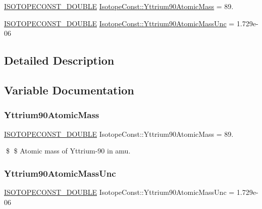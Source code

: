 \begin{DoxyCompactItemize}
\item 
\mbox{\hyperlink{group___isotope_const-_macros_ga8f45a7272ce02c0b4c65c44636ed719a}{I\+S\+O\+T\+O\+P\+E\+C\+O\+N\+S\+T\+\_\+\+D\+O\+U\+B\+LE}} \mbox{\hyperlink{group___isotope_const-_yttrium-_y90_gafc8eecd3394b7f646ce1ec90abb9c08e}{Isotope\+Const\+::\+Yttrium90\+Atomic\+Mass}} = 89.
\item 
\mbox{\hyperlink{group___isotope_const-_macros_ga8f45a7272ce02c0b4c65c44636ed719a}{I\+S\+O\+T\+O\+P\+E\+C\+O\+N\+S\+T\+\_\+\+D\+O\+U\+B\+LE}} \mbox{\hyperlink{group___isotope_const-_yttrium-_y90_ga26778a4fea2121a9a4a6354ebd33071e}{Isotope\+Const\+::\+Yttrium90\+Atomic\+Mass\+Unc}} = 1.\+729e-\/06
\end{DoxyCompactItemize}


\subsection{Detailed Description}


\subsection{Variable Documentation}
\mbox{\label{group___isotope_const-_yttrium-_y90_gafc8eecd3394b7f646ce1ec90abb9c08e}} 
\subsubsection{\texorpdfstring{Yttrium90\+Atomic\+Mass}{Yttrium90AtomicMass}}
{\footnotesize\ttfamily \mbox{\hyperlink{group___isotope_const-_macros_ga8f45a7272ce02c0b4c65c44636ed719a}{I\+S\+O\+T\+O\+P\+E\+C\+O\+N\+S\+T\+\_\+\+D\+O\+U\+B\+LE}} Isotope\+Const\+::\+Yttrium90\+Atomic\+Mass = 89.}

\$ \$ Atomic mass of Yttrium-\/90 in amu. \mbox{\label{group___isotope_const-_yttrium-_y90_ga26778a4fea2121a9a4a6354ebd33071e}} 
\subsubsection{\texorpdfstring{Yttrium90\+Atomic\+Mass\+Unc}{Yttrium90AtomicMassUnc}}
{\footnotesize\ttfamily \mbox{\hyperlink{group___isotope_const-_macros_ga8f45a7272ce02c0b4c65c44636ed719a}{I\+S\+O\+T\+O\+P\+E\+C\+O\+N\+S\+T\+\_\+\+D\+O\+U\+B\+LE}} Isotope\+Const\+::\+Yttrium90\+Atomic\+Mass\+Unc = 1.\+729e-\/06}

